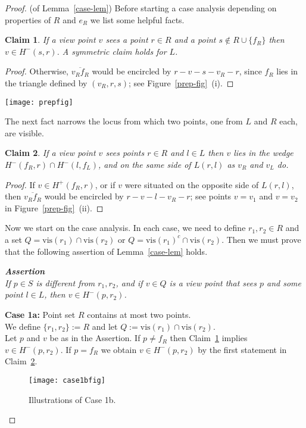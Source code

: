 \documentclass[11pt]{article}
\newtheorem{claim}{Claim}
\begin{document}
\begin{proof} (of Lemma~\ref{case-lem}) Before starting a case analysis depending on properties of
$R$ and $e_R$ we list some helpful facts.

\begin{claim}         \label{prep1-claim}
If a view point $v$ sees a point $r \in R$ and a point $s \notin R \cup \{f_R\}$ then
$v \in H^-(s,r)$. A symmetric claim holds for $L$.
\end{claim}
\begin{proof}
Otherwise, $\overline{v_Rf_R}$ would be encircled by $r-v-s-v_R-r$, 
since $f_R$ lies in the triangle defined by $(v_R,r,s)$; see Figure~\ref{prep-fig}~(i).
\end{proof}
\begin{figure*}[hbtp]\begin{center}\texttt{[image: prepfig]}\caption{Illustration to Claims~\ref{prep1-claim} and~\ref{prep2-claim}.}\label{prep-fig}
  \end{center}\end{figure*}
The next fact narrows the locus from which two points, one from $L$ and $R$ each,
are visible. 
\begin{claim}         \label{prep2-claim}
If a view point $v$ sees points $r \in R$ and $l \in L$ then
$v$ lies in the wedge $H^-(f_R,r) \cap H^-(l,f_L)$, and on the same side of $L(r,l)$
as $v_R$ and $v_L$ do.
\end{claim}
\begin{proof}
If $v \in H^+(f_R,r)$, or if $v$ were situated on the opposite side of $L(r,l)$, 
then $\overline{v_Rf_R}$ would be encircled by $r-v-l-v_R-r$; see points $v=v_1$ and $v=v_2$ 
in Figure~\ref{prep-fig}~(ii).
\end{proof}

Now we start on the case analysis. In each case, we need to define $r_1, r_2 \in R$ and 
a set $Q=\mbox{vis}(r_1) \cap \mbox{vis}(r_2)$ or $Q=\mbox{vis}(r_1)^c \cap \mbox{vis}(r_2)$.
Then we must prove that the following assertion of Lemma~\ref{case-lem} holds.

{\em {\bf Assertion}\\
 If $p \in S$ is different from $r_1, r_2$, and if $v \in Q$ is a view point that sees $p$ and
some  point $l \in L$, then $v \in H^-(p,r_2)$.}

{\bf Case 1a:} Point set $R$ contains at most two points.\\
We define $\{r_1, r_2\}:=R$ and let $Q:=  \mbox{vis}(r_1) \cap \mbox{vis}(r_2)$.\\
Let $p$ and $v$ be as in the Assertion.
If $p \not= f_R$ then Claim~\ref{prep1-claim} implies $v \in H^-(p,r_2)$. 
If $p= f_R$ we obtain $v \in H^-(p,r_2)$  by the first statement in Claim~\ref{prep2-claim}.
\begin{figure}[hbtp]\begin{center}\texttt{[image: case1bfig]}\caption{Illustrations of Case 1b.}\label{case1b-fig}
  \end{center}\end{figure}



\end{proof}
\end{document}
